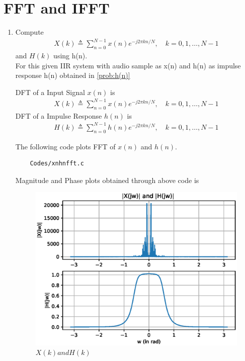 \documentclass[journal,12pt,twocolumn]{IEEEtran}
\renewcommand\thesection{\arabic{section}}
\begin{document}
\section{FFT and IFFT}
\begin{enumerate}[label=\thesection.\arabic*
,ref=\thesection.\theenumi]
\item Compute
\begin{align}
        X(k) \triangleq \sum_{n=0}^{N-1} x(n) e^{-j 2 \pi k n / N}, \quad k=0,1, \ldots, N-1
\end{align}
and $H(k)$ using h(n).
\\
\solution
For this given IIR system with audio sample as x(n) and h(n) as impulse response h(n) obtained in \ref{prob:h(n)} 

DFT of a Input Signal $x(n)$ is 
\begin{align}
    X(k) \triangleq \sum_{n=0}^{N-1} x(n) e^{-j 2 \pi k n / N}, \quad k=0,1, \ldots, N-1
\end{align}
DFT of a Impulse Response $h(n)$ is 
\begin{align}
    H(k) \triangleq \sum_{n=0}^{N-1} h(n) e^{-j 2 \pi k n / N}, \quad k=0,1, \ldots, N-1
\end{align}

The following code plots FFT of $x(n)$ and $h(n)$.
\begin{lstlisting}
    Codes/xnhnfft.c
\end{lstlisting}
Magnitude and Phase plots obtained through above code is 
\begin{figure}[!ht]
\centering
\includegraphics[width=\columnwidth]{./figs/xnhnfft.eps}
\caption{$X(k) and H(k)$}
\label{fig:xnhnfft}
\end{figure}


\end{enumerate}
\end{document}
